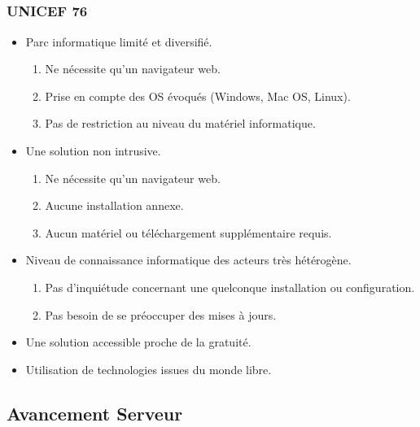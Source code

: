 \subsection{} %

\begin{frame}
  \frametitle{UNICEF 76}
  \begin{itemize}
    \item Parc informatique limité et diversifié.
      \begin{enumerate}
        \item Ne nécessite qu'un navigateur web.
        \item Prise en compte des OS évoqués (Windows, Mac OS, Linux).
        \item Pas de restriction au niveau du matériel informatique.
      \end{enumerate}
    \item Une solution non intrusive.
      \begin{enumerate}
        \item Ne nécessite qu'un navigateur web.
        \item Aucune installation annexe.
        \item Aucun matériel ou téléchargement supplémentaire requis.
      \end{enumerate}
    \item Niveau de connaissance informatique des acteurs très hétérogène.
      \begin{enumerate}
        \item Pas d'inquiétude concernant une quelconque installation ou configuration.
        \item Pas besoin de se préoccuper des mises à jours.  
      \end{enumerate}
    \item Une solution accessible proche de la gratuité.
    \item Utilisation de technologies issues du monde libre.
  \end{itemize}
\end{frame}

\subsection{}


\speaker{\Matthieu}
\subsection{Avancement Serveur}


